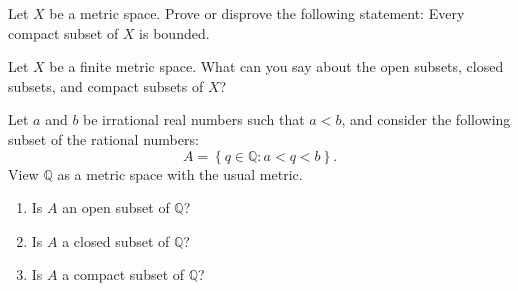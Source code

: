 \documentclass[12pt,letterpaper,boxed,cm]{hmcpset}
\newcommand{\set}[1]{\left\{#1\right\}}
\newcommand{\Q}[0]{\mathbb{Q}}
\begin{document}

\begin{problem}[1)]
    Let $X$ be a metric space. Prove or disprove the following statement: Every compact subset of $X$ is bounded.
\end{problem}

\begin{solution}
    \vfill
\end{solution}
\newpage

\begin{problem}[2)]
    Let $X$ be a finite metric space. What can you say about the open subsets, closed subsets, and compact subsets of $X$?
\end{problem}

\begin{solution}
    \vfill
\end{solution}
\newpage

\begin{problem}[3)]
    Let $a$ and $b$ be irrational real numbers such that $a < b$, and consider the following subset of the rational numbers:
    \[
        A = \set{q \in \Q : a < q < b}.
    \]
    View $\Q$ as a metric space with the usual metric. 
    \begin{enumerate}[label=\alph*.]
        \item Is $A$ an open subset of $\Q$?
        \item Is $A$ a closed subset of $\Q$?
        \item Is $A$ a compact subset of $\Q$?
    \end{enumerate}
\end{problem}

\begin{solution}
    \vfill
\end{solution}
\end{document}
